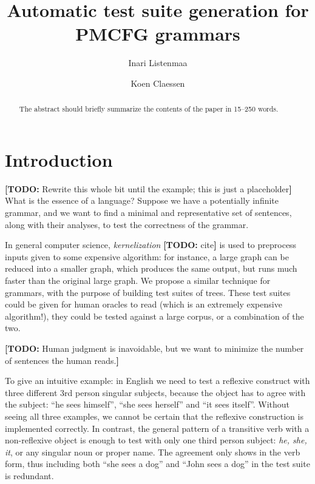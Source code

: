 \documentclass[runningheads]{llncs}
\newcommand{\todo}[1]{{\color{cyan}\textbf{[TODO: }#1\textbf{]}}}
\begin{document}
%
\title{Automatic test suite generation for PMCFG grammars}
%
%
\author{Inari Listenmaa \and
Koen Claessen}
%
%
%
\maketitle              %
%
\begin{abstract}
The abstract should briefly summarize the contents of the paper in
15--250 words.

\end{abstract}
%
%
%
\section{Introduction}

\todo{Rewrite this whole bit until the example; this is just a placeholder}
What is the essence of a language? 
Suppose we have a potentially infinite grammar, and we want to find a
minimal and representative set of sentences, along with their
analyses, to test the correctness of the grammar.

In general computer science, \emph{kernelization} \todo{cite} is used
to preprocess inputs given to some expensive algorithm: for instance,
a large graph can be reduced into a smaller graph, which produces the
same output, but runs much faster than the original large graph. We
propose a similar technique for grammars, with the purpose of building
test suites of trees. These test suites could be given for human
oracles to read (which is an extremely expensive algorithm!), they
could be tested against a large corpus, or a combination of the two. 

\todo{Human judgment is inavoidable, but we want to minimize the
  number of sentences the human reads.}

To give an intuitive example: in English we need to test a reflexive
construct with three different 3rd person singular subjects, because
the object has to agree with the subject: ``he sees himself'', ``she
sees herself'' and ``it sees itself''. Without seeing all three
examples, we cannot be certain that the reflexive construction is
implemented correctly. In contrast, the general pattern of a transitive
verb with a non-reflexive object is enough to test with only one third
person subject: \emph{he, she, it}, or any singular noun or proper
name. The agreement only shows in the verb form, thus including both
``she sees a dog'' and ``John sees a dog'' in the test suite is redundant. 
\end{document}
